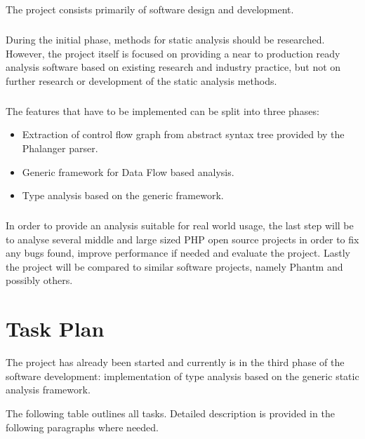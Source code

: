 The project consists primarily of software design and development. 

\paragraph*{}
During the initial phase, methods for static analysis should be 
researched. However, the project itself is focused on providing 
a near to production ready analysis software based on existing 
research and industry practice, but not on further research 
or development of the static analysis methods.

\paragraph*{}
The features that have to be implemented can 
be split into three phases:
\begin{itemize}
    \item Extraction of control flow graph from abstract syntax tree provided by the Phalanger parser.
    \item Generic framework for Data Flow based analysis.
    \item Type analysis based on the generic framework.
\end{itemize}

\paragraph*{}
In order to provide an analysis suitable for real world usage, 
the last step will be to analyse several middle and large sized 
PHP open source projects in order to fix any bugs found, 
improve performance if needed and evaluate the project. 
Lastly the project will be compared to similar software 
projects, namely Phantm \cite{kneuss2010using} and possibly others.


\chapter{Task Plan}
The project has already been started and currently is in the 
third phase of the software development: implementation of type 
analysis based on the generic static analysis framework. 

The following table outlines all tasks. Detailed description 
is provided in the following paragraphs where needed.

